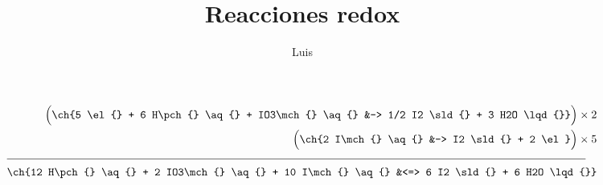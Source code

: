 \documentclass[10pt,a4paper]{article}
\title{Reacciones redox}
\author{Luis}
\date{}
\begin{document}
\maketitle


\begin{align*}
\Big(\ch{5 \el{} + 6 H\pch{} \aq{} + IO3\mch{} \aq{} &-> 1/2 I2 \sld{} + 3 H2O \lqd{}} \Big) \times 2\\
\Big(\ch{2 I\mch{} \aq{} &-> I2 \sld{} + 2 \el}\Big) \times 5\\
\cline{1-2}
\ch{12 H\pch{} \aq{} + 2 IO3\mch{} \aq{} + 10 I\mch{} \aq{} &<=> 6 I2 \sld{} + 6 H2O \lqd{}}
\end{align*}



 
\end{document}
